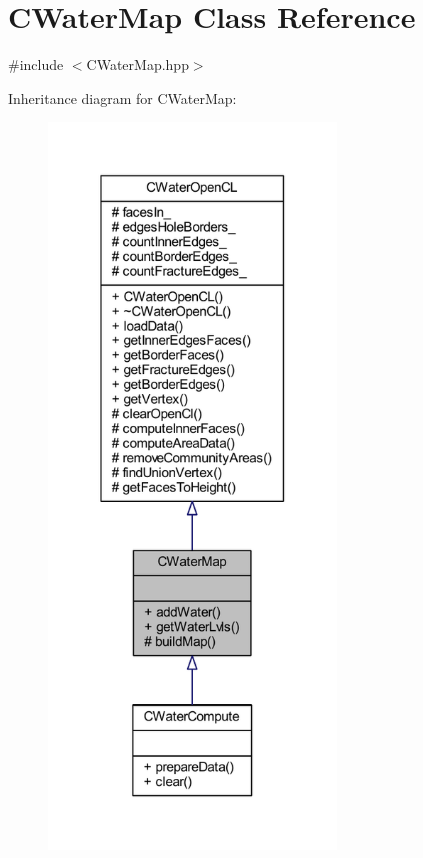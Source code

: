 \hypertarget{class_c_water_map}{}\section{C\+Water\+Map Class Reference}
\label{class_c_water_map}


{\ttfamily \#include $<$C\+Water\+Map.\+hpp$>$}



Inheritance diagram for C\+Water\+Map\+:
\nopagebreak
\begin{figure}[H]
\begin{center}
\leavevmode
\includegraphics[width=217pt]{class_c_water_map__inherit__graph}
\end{center}
\end{figure}



